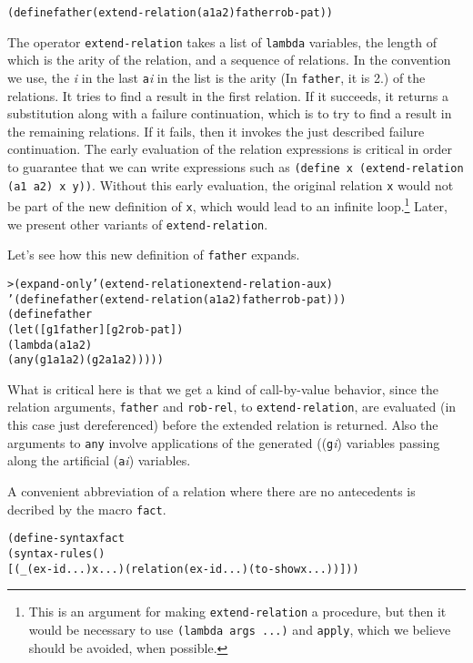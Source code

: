 \begin{alltt}
(define father (extend-relation (a1 a2) father rob-pat))
\end{alltt}

The operator \texttt{extend-relation} takes a list of \texttt{lambda}
variables, the length of which is the arity of the relation, and a
sequence of relations. In the convention we use, the \emph{i} in the
last \texttt{a}\emph{i} in the list is the arity (In \texttt{father},
it is 2.) of the relations.  It tries to find a result in the first
relation. If it succeeds, it returns a substitution along with a
failure continuation, which is to try to find a result in the
remaining relations.  If it fails, then it invokes the just described
failure continuation.  The early evaluation of the relation
expressions is critical in order to guarantee that we can write
expressions such as \texttt{(define x (extend-relation (a1 a2) x y))}.
Without this early evaluation, the original relation \texttt{x} would
not be part of the new definition of \texttt{x}, which would lead to
an infinite loop.\footnote{This is an argument for making
\texttt{extend-relation} a procedure, but then it would be necessary
to use \texttt{(lambda args ...)} and \texttt{apply}, which we believe
should be avoided, when possible.}  Later, we present other variants of
\texttt{extend-relation}.

Let's see how this new definition of \texttt{father} expands.

\begin{alltt}
> (expand-only '(extend-relation extend-relation-aux)
    '(define father (extend-relation (a1 a2) father rob-pat)))
(define father
  (let ([g1 father] [g2 rob-pat])
    (lambda (a1 a2)
      (any (g1 a1 a2) (g2 a1 a2)))))
\end{alltt}
\noindent
What is critical here is that we get a kind of call-by-value behavior,
since the relation arguments, \texttt{father} and \texttt{rob-rel}, to
\texttt{extend-relation}, are evaluated (in this case just
dereferenced) before the extended relation is returned.  Also the
arguments to \texttt{any} involve applications of the generated
((\texttt{g}\emph{i}) variables passing along the artificial
(\texttt{a}\emph{i}) variables.

A convenient abbreviation of a relation where there are no antecedents
is decribed by the macro \texttt{fact}.

\begin{alltt}
(define-syntax fact
  (syntax-rules ()
    [(_ (ex-id ...) x ...) (relation (ex-id ...) (to-show x ...))]))
\end{alltt}


